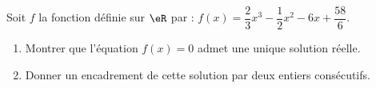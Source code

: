 
\begin{exercice}\label{exoanalyseCTU-0024}


Soit $f$ la fonction définie sur  $\eR$ par : $f(x) = \dfrac23x^3-\dfrac12 x^2-6x+\dfrac{58}6$. 
\begin{enumerate}
\item Montrer que l'équation $f(x)=0$ admet une unique solution
réelle. 
\item Donner un encadrement de cette solution par deux entiers consécutifs.
\end{enumerate}


\end{exercice}

